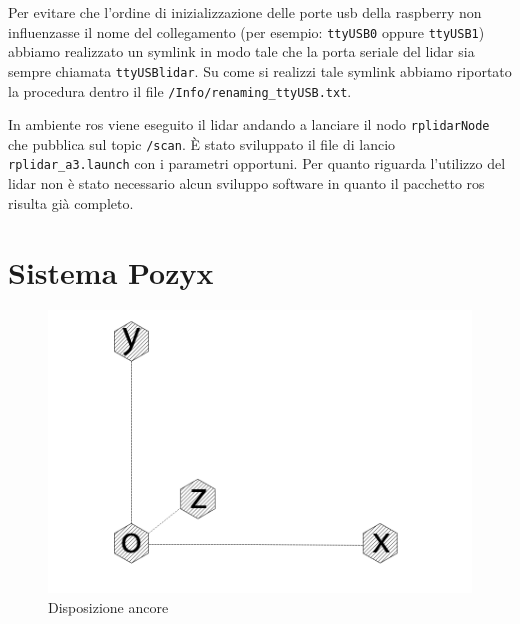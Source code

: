 Per evitare che l'ordine di inizializzazione delle porte usb della raspberry non influenzasse il nome del collegamento (per esempio: \texttt{ttyUSB0} oppure \texttt{ttyUSB1})
abbiamo realizzato un symlink in modo tale che la porta seriale del lidar sia sempre chiamata \texttt{ttyUSBlidar}. 
Su come si realizzi tale symlink abbiamo riportato la procedura dentro il file \texttt{/Info/renaming\_ttyUSB.txt}.

In ambiente ros viene eseguito il lidar andando a lanciare il nodo \texttt{rplidarNode} che pubblica sul topic \texttt{/scan}. 
\`E stato sviluppato il file di lancio \texttt{rplidar\_a3.launch} con i parametri opportuni.  
Per quanto riguarda l'utilizzo del lidar non \`e stato necessario alcun sviluppo software in quanto il pacchetto ros risulta gi\`a completo.


\newpage
\section{Sistema Pozyx}
\label{sez:Sistema Pozyx}

\begin{figure}[h]
	\centering
	\includegraphics[height=0.2\textheight]{uwb_axis.png}
	\caption{Disposizione ancore}
	\label{fig: disposizione ancore}
\end{figure}



